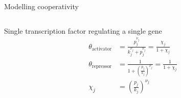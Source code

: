 
\begin{frame}{Modelling cooperativity}
\begin{columns}
\begin{column}{0.4\textwidth}
Single transcription factor regulating a single gene~\cite{Alon2006}
\begin{subequations}
\label{eq:Hill}
\begin{align}
\label{eq:Hill_activator}
\theta_{\text{activator}} &= \frac{p_j^{\nu_j}}{k_j^{\nu_j} + p_j^{\nu_j}} = \frac{\chi_j}{1 + \chi_j}
\\
\label{eq:Hill_repressor}
\theta_{\text{repressor}} &= \frac{1}{1 + \left(\frac{p_j}{k_j} \right)^{\nu_j}} = \frac{1}{1 + \chi_j}
\\
\chi_j &=
\left( \frac{p_j}{k_j} \right) ^ {\nu_j}
\end{align}
\end{subequations}



\end{column}
\end{columns}
\end{frame}
